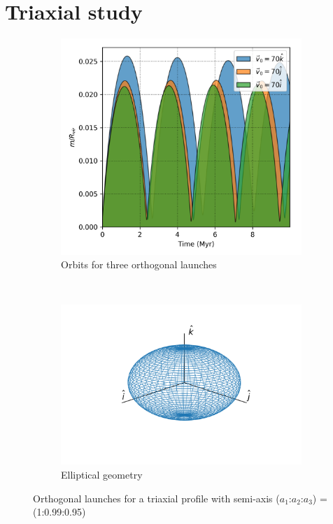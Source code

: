 	\section{Triaxial study}
	\begin{figure}[h]
		\centering
		\begin{subfigure}[b]{0.49\textwidth}
			\includegraphics[width = \textwidth]{"../Files/Week 7/orthogonal_triaxial"}
			\caption{Orbits for three orthogonal launches}
			\label{fig: orthogonalLaunches}
		\end{subfigure}
		~ 
		\begin{subfigure}[b]{0.49\textwidth}
			\includegraphics[width=\textwidth]{"../Files/Week 7/ellipsoid"}
			\caption{Elliptical geometry}
		\end{subfigure}
		\caption{Orthogonal launches for a triaxial profile with semi-axis ($a_1$:$a_2$:$a_3$) = (1:0.99:0.95)}
		\label{fig: mainOrthogonalLaunches}
	\end{figure}